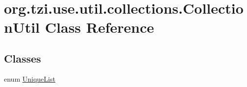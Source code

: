 \hypertarget{classorg_1_1tzi_1_1use_1_1util_1_1collections_1_1_collection_util}{\section{org.\-tzi.\-use.\-util.\-collections.\-Collection\-Util Class Reference}
\label{classorg_1_1tzi_1_1use_1_1util_1_1collections_1_1_collection_util}
}
\subsection*{Classes}
\begin{DoxyCompactItemize}
\item 
enum \hyperlink{enumorg_1_1tzi_1_1use_1_1util_1_1collections_1_1_collection_util_1_1_unique_list}{Unique\-List}
\end{DoxyCompactItemize}
